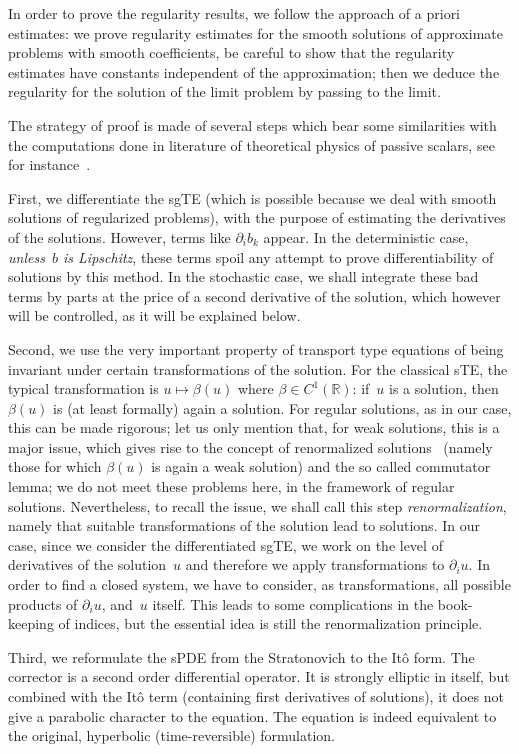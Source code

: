 \documentclass[a4paper,10pt]{article}
\newcommand\1{\mathbbm{1}}
\numberwithin{equation}{section}
\begin{document}
In order to prove the regularity results, we follow the approach of a priori estimates: we prove regularity estimates for the smooth solutions of approximate problems with smooth coefficients, be careful to show that the regularity estimates have constants independent of the approximation; then we deduce the regularity for the solution of the limit problem by passing to the limit.

The strategy of proof is made of several steps which bear some similarities with the computations done in literature of theoretical physics of passive scalars, see for instance~\cite{GaKuVe}.

First, we differentiate the sgTE (which is possible because we deal with smooth solutions of regularized problems), with the purpose of estimating the derivatives of the solutions. However, terms like $\partial_{i}b_{k}$ appear. In the deterministic case, \emph{unless~$b$ is Lipschitz}, these terms spoil any attempt to prove differentiability of solutions by this method. In the stochastic case, we shall integrate these bad terms by parts at the price of a second derivative of the solution, which however will be controlled, as it will be explained below.

Second, we use the very important property of transport type equations of being invariant under certain transformations of the solution. For the classical sTE, the typical transformation is $u \mapsto \beta(u)$ where $\beta\in C^{1}(\mathbb{R})$: if~$u$ is a solution, then $\beta(u)$ is (at least formally) again a solution. For
regular solutions, as in our case, this can be made rigorous; let us only mention that, for weak solutions, this is a major issue, which gives rise to the
concept of renormalized solutions~\cite{DIPELI89} (namely those for which $\beta(u)$ is again a weak solution) and the so called commutator lemma; we
do not meet these problems here, in the framework of regular solutions. Nevertheless, to recall the issue, we shall call this step \emph{renormalization}, namely that suitable transformations of the solution lead to solutions. In our case, since we consider the differentiated sgTE, we work on the level of derivatives of the solution~$u$ and therefore we apply transformations to $\partial_{i}u$. In order to find a closed system, we have to consider, as transformations, all possible products of $\partial_{i}u$, and~$u$ itself. This leads to some complications in the book-keeping of indices, but the essential idea is still the renormalization principle.

Third, we reformulate the sPDE from the Stratonovich to the It\^{o} form. The corrector is a second order differential operator. It is strongly elliptic in itself, but combined with the It\^{o} term (containing first derivatives of solutions), it does not give a parabolic character to the equation. The equation is indeed equivalent to the original, hyperbolic (time-reversible) formulation.
\end{document}
